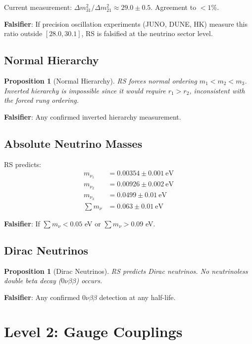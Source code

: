\documentclass[12pt,a4paper]{article}
\newtheorem{proposition}[theorem]{Proposition}
\theoremstyle{definition}
\theoremstyle{remark}
\begin{document}
Current measurement: $\Delta m^2_{31}/\Delta m^2_{21} \approx 29.0 \pm 0.5$.
Agreement to $< 1\%$.

\textbf{Falsifier}: If precision oscillation experiments (JUNO, DUNE, HK) measure this ratio 
outside $[28.0, 30.1]$, RS is falsified at the neutrino sector level.

\subsection{Normal Hierarchy}

\begin{proposition}[Normal Hierarchy]
RS forces normal ordering $m_1 < m_2 < m_3$. Inverted hierarchy is impossible 
since it would require $r_1 > r_2$, inconsistent with the forced rung ordering.
\end{proposition}

\textbf{Falsifier}: Any confirmed inverted hierarchy measurement.

\subsection{Absolute Neutrino Masses}

RS predicts:
\begin{align}
m_{\nu_1} &= 0.00354 \pm 0.001~\mathrm{eV}\\
m_{\nu_2} &= 0.00926 \pm 0.002~\mathrm{eV}\\
m_{\nu_3} &= 0.0499 \pm 0.01~\mathrm{eV}\\
\sum m_\nu &= 0.063 \pm 0.01~\mathrm{eV}
\end{align}

\textbf{Falsifier}: If $\sum m_\nu < 0.05$ eV or $\sum m_\nu > 0.09$ eV.

\subsection{Dirac Neutrinos}

\begin{proposition}[Dirac Neutrinos]
RS predicts Dirac neutrinos. No neutrinoless double beta decay ($0\nu\beta\beta$) occurs.
\end{proposition}

\textbf{Falsifier}: Any confirmed $0\nu\beta\beta$ detection at any half-life.

\section{Level 2: Gauge Couplings}
\end{document}
